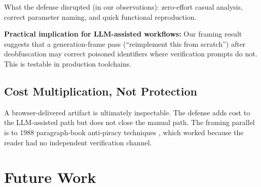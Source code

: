 \documentclass[11pt]{article}
\begin{document}
What the defense disrupted (in our observations): zero-effort casual
analysis, correct parameter naming, and quick functional reproduction.

\textbf{Practical implication for LLM-assisted workflows:} Our framing
result suggests that a generation-frame pass (``reimplement this from
scratch'') after deobfuscation may correct poisoned identifiers where
verification prompts do not. This is testable in production toolchains.

\subsection{Cost Multiplication, Not Protection}

A browser-delivered artifact is ultimately inspectable. The defense
adds cost to the LLM-assisted path but does not close the manual
path. The framing parallel is to 1988 paragraph-book anti-piracy
techniques \cite{sentinel1988,wasteland2016}, which worked because the reader had no independent
verification channel.

\section{Future Work}
\end{document}
